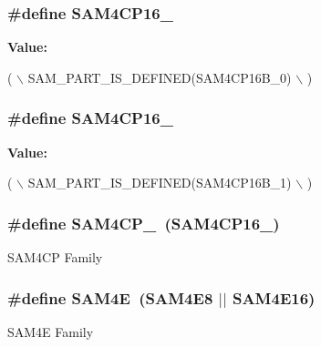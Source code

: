 \subsubsection[{S\+A\+M4\+C\+P16\+\_\+0}]{\setlength{\rightskip}{0pt plus 5cm}\#define S\+A\+M4\+C\+P16\+\_}\label{group__sam__part__macros__group_gaa7359e4b343a4ab48894b656b2f349b9}
{\bfseries Value\+:}
\begin{DoxyCode}
( \(\backslash\)
        SAM\_PART\_IS\_DEFINED(SAM4CP16B\_0) \(\backslash\)
        )
\end{DoxyCode}
\hypertarget{group__sam__part__macros__group_ga6757116bcbffd58eca2b98b620175590}{}
\subsubsection[{S\+A\+M4\+C\+P16\+\_\+1}]{\setlength{\rightskip}{0pt plus 5cm}\#define S\+A\+M4\+C\+P16\+\_}\label{group__sam__part__macros__group_ga6757116bcbffd58eca2b98b620175590}
{\bfseries Value\+:}
\begin{DoxyCode}
( \(\backslash\)
        SAM\_PART\_IS\_DEFINED(SAM4CP16B\_1) \(\backslash\)
        )
\end{DoxyCode}
\hypertarget{group__sam__part__macros__group_ga01ca8a083b5d4d9ba3c24c9314f69264}{}
\subsubsection[{S\+A\+M4\+C\+P\+\_\+0}]{\setlength{\rightskip}{0pt plus 5cm}\#define S\+A\+M4\+C\+P\+\_~(S\+A\+M4\+C\+P16\+\_)}\label{group__sam__part__macros__group_ga01ca8a083b5d4d9ba3c24c9314f69264}
S\+A\+M4\+C\+P Family \hypertarget{group__sam__part__macros__group_ga7266cd2c26bf5ed34a006ed97f34db76}{}
\subsubsection[{S\+A\+M4\+E}]{\setlength{\rightskip}{0pt plus 5cm}\#define S\+A\+M4\+E~(S\+A\+M4\+E8 $\vert$$\vert$ S\+A\+M4\+E16)}\label{group__sam__part__macros__group_ga7266cd2c26bf5ed34a006ed97f34db76}
S\+A\+M4\+E Family \hypertarget{group__sam__part__macros__group_ga7e756ab3c18b6c54de1d7f376e13eaa3}{}
